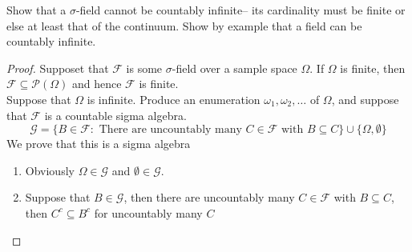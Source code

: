 \documentclass[12pt]{article}
\newcommand{\F}{\mathcal{F}}
\newcommand{\G}{\mathcal{G}}
\newcommand{\seq}{\subseteq}
\newcommand{\om}{\omega}
\newcommand{\Om}{\Omega}
\newcommand{\es}{\emptyset}
\newcommand{\mc}{\mathcal}
\newcommand{\un}{\cup}
\newenvironment{exercise}[2][Exercise]{\begin{trivlist}
\item[\hskip \labelsep {\bfseries #1}\hskip \labelsep {\bfseries #2.}]}{\end{trivlist}}
\begin{document}
\begin{exercise}{2.12}
    Show that a $\sigma$-field cannot be countably infinite-- its cardinality must be finite or else at least that of the continuum. Show by example that a field can be countably infinite.
\end{exercise}
\begin{proof}
    Supposet that $\F$ is some $\sigma$-field over a sample space $\Om$. If $\Om$ is finite, then $\F \seq \mc P (\Om)$ and hence $\F$ is finite. \\
    Suppose that $\Om$ is infinite. Produce an enumeration $\om_1, \om_2, \ldots$ of $\Om$, and suppose that $\F$ is a countable sigma algebra. 
    \[ \G = \{ B \in \F : \text { There are uncountably many } C \in \F \text{ with } B \seq C \} \un \{ \Om, \es \} \]
    We prove that this is a sigma algebra
    \begin{enumerate}
        \item Obviously $\Om \in \G$ and $\es \in \G$.
        \item Suppose that $B \in \G$, then there are uncountably many $C \in \F$ with $B \seq C$, then $C^{c} \seq B^{c}$ for uncountably many $C$
    \end{enumerate}
\end{proof}
\end{document}
